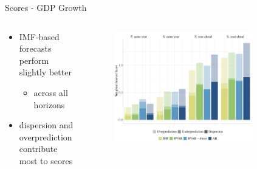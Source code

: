 \documentclass[en]{sdqbeamer}
\begin{document}
\begin{frame}{Scores - GDP Growth}
\begin{columns}
\begin{column}{0.35\textwidth}
    \begin{itemize}
         \item IMF-based forecasts perform slightly better 
         \begin{itemize}
         \item across all horizons\medskip
         \end{itemize}
         \item dispersion and overprediction contribute most to scores
    \end{itemize}
    \vspace{2cm}
\end{column}
\begin{column}{0.65\textwidth}
\vspace*{-.95cm}
    \begin{figure}
        \centering
        \includegraphics[width=0.8\textwidth]{figures_svr/svr_wis_ngdp_rpch_absolute_rollingwindow.pdf} 
        \label{fig:enter-label}
    \end{figure} 
\end{column}
\end{columns}
\end{frame}




\end{document}

